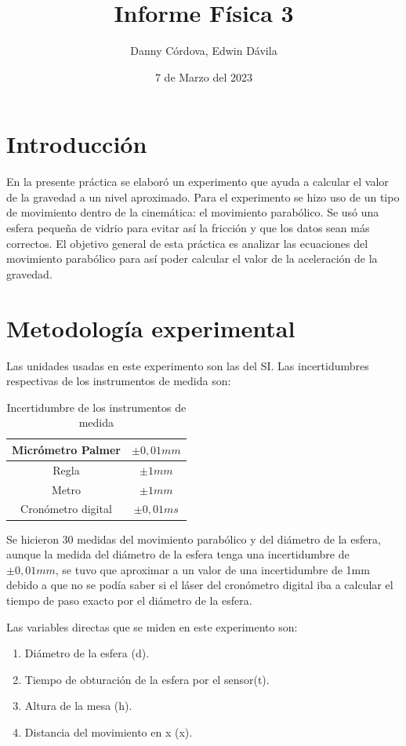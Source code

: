 \documentclass[a4paper]{article}
\title{Informe Física 3}
\author{Danny Córdova, Edwin Dávila}
\date{7 de Marzo del 2023}
\begin{document}
\maketitle

\section{Introducción}
En la presente práctica se elaboró un experimento que ayuda a calcular el valor de la gravedad a un nivel aproximado. Para el experimento se hizo uso de un tipo de movimiento dentro de la cinemática: el movimiento parabólico. Se usó una esfera pequeña de vidrio para evitar así la fricción y que los datos sean más correctos. El objetivo general de esta práctica es analizar las ecuaciones del movimiento parabólico para así poder calcular el valor de la aceleración de la gravedad.

\section{Metodología experimental}
Las unidades usadas en este experimento son las del SI. Las incertidumbres respectivas de los instrumentos de medida son:

\begin{table}[H]
    \centering
    \begin{tabular}{|c|c|}
    \hline
        Micrómetro Palmer & $\pm0,01 mm$ \\ \hline
        Regla  & $\pm 1 mm$ \\ \hline
        Metro  & $\pm 1 mm$ \\ \hline
        Cronómetro digital  & $\pm 0,01 ms$ \\ \hline
    \end{tabular}
    \caption{Incertidumbre de los instrumentos de medida}
    \label{Incertidumbre de los instrumentos de medida}
\end{table}

Se hicieron 30 medidas del movimiento parabólico y del diámetro de la esfera, aunque la medida del diámetro de la esfera tenga una incertidumbre de $\pm0,01 mm$, se tuvo que aproximar a un valor de una incertidumbre de 1mm debido a que no se podía saber si el láser del cronómetro digital iba a calcular el tiempo de paso exacto por el diámetro de la esfera.

Las variables directas que se miden en este experimento son:
\begin{enumerate}
  \item Diámetro de la esfera (d).
  \item Tiempo de obturación de la esfera por el sensor(t).
  \item Altura de la mesa (h).
  \item Distancia del movimiento en x (x).
\end{enumerate}
\end{document}
